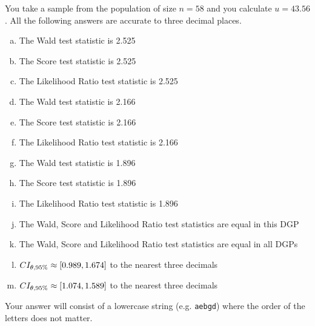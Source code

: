 \documentclass[12pt,landscape]{article}
\newcommand{\instr}{\small Your answer will consist of a lowercase string (e.g. \texttt{aebgd}) where the order of the letters does not matter. \normalsize}
\begin{document}
\problem{}  You take a sample from the population of size $n=58$ and you calculate $u = 43.56$. All the following answers are accurate to three decimal places.


\vspace{-0.2cm}\benum{} 

\begin{enumerate}[(a)]
\item The Wald test statistic is 2.525
\item The Score test statistic is 2.525
\item The Likelihood Ratio test statistic is 2.525
\item The Wald test statistic is 2.166
\item The Score test statistic is 2.166
\item The Likelihood Ratio test statistic is 2.166
\item The Wald test statistic is 1.896
\item The Score test statistic is 1.896
\item The Likelihood Ratio test statistic is 1.896
\item The Wald, Score and Likelihood Ratio test statistics are equal in this DGP
\item The Wald, Score and Likelihood Ratio test statistics are equal in all DGPs
\item $CI_{\theta, 95\%} \approx \left[0.989, 1.674\right]$ to the nearest three decimals %
\item $CI_{\theta, 95\%} \approx \left[1.074, 1.589\right]$ to the nearest three decimals
\end{enumerate}
\eenum\instr\pagebreak
\end{document}
